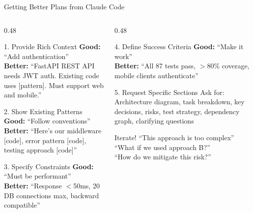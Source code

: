 \documentclass[aspectratio=169,10pt]{beamer}
\begin{document}
\begin{frame}{Getting Better Plans from Claude Code}
    \begin{columns}[T]
        \begin{column}{0.48\textwidth}
            \begin{block}{1. Provide Rich Context}
                \textbf{Good:} ``Add authentication''\\
                \textbf{Better:} ``FastAPI REST API needs JWT auth. Existing code uses [pattern]. Must support web and mobile.''
            \end{block}
            \begin{block}{2. Show Existing Patterns}
                \textbf{Good:} ``Follow conventions''\\
                \textbf{Better:} ``Here's our middleware [code], error pattern [code], testing approach [code]''
            \end{block}
            \begin{block}{3. Specify Constraints}
                \textbf{Good:} ``Must be performant''\\
                \textbf{Better:} ``Response $<$50ms, 20 DB connections max, backward compatible''
            \end{block}
        \end{column}
        \begin{column}{0.48\textwidth}
            \begin{block}{4. Define Success Criteria}
                \textbf{Good:} ``Make it work''\\
                \textbf{Better:} ``All 87 tests pass, $>$80\% coverage, mobile clients authenticate''
            \end{block}
            \begin{block}{5. Request Specific Sections}
                Ask for: Architecture diagram, task breakdown, key decisions, risks, test strategy, dependency graph, clarifying questions
            \end{block}
            \vspace{0.2cm}
            \begin{alertblock}{Iterate!}
                ``This approach is too complex''\\
                ``What if we used approach B?''\\
                ``How do we mitigate this risk?''
            \end{alertblock}
        \end{column}
    \end{columns}

\end{frame}
\end{document}

